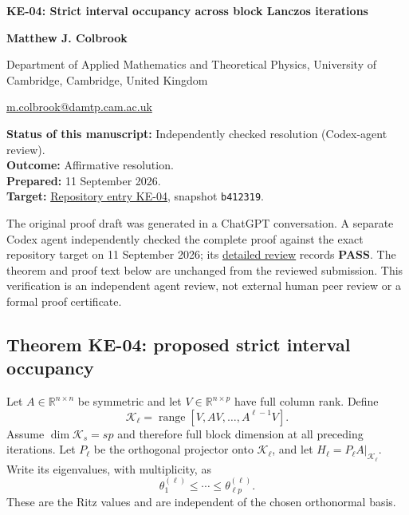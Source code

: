 \documentclass[10pt,a4paper]{article}
\begin{document}
{\raggedright\Large\bfseries KE-04: Strict interval occupancy across
block Lanczos iterations\par}
\vspace{0.4em}
{\normalsize\bfseries Matthew J. Colbrook\par}
{\small Department of Applied Mathematics and Theoretical Physics,
University of Cambridge, Cambridge, United Kingdom\par}
{\small\href{mailto:m.colbrook@damtp.cam.ac.uk}{m.colbrook@damtp.cam.ac.uk}\par}
\vspace{0.6em}
\textbf{Status of this manuscript:} Independently checked resolution
(Codex-agent review).\\
\textbf{Outcome:} Affirmative resolution.\\
\textbf{Prepared:} 11 September 2026.\\
\textbf{Target:}
\href{https://github.com/ajt60gaibb/OpenProblemsInNLA/blob/b4123194697bdf6f8f82518c1dd7d6c40a30c2e0/eigenvalues-and-inverse-problems/KE-04/README.md}{Repository
entry KE-04}, snapshot \texttt{b412319}.

The original proof draft was generated in a ChatGPT conversation. A
separate Codex agent independently checked the complete proof against
the exact repository target on 11 September 2026; its
\href{https://github.com/ajt60gaibb/OpenProblemsInNLA/blob/main/references/colbrook-2026-09-11/verification/reviews/KE-04-review.md}{detailed
review} records \textbf{PASS}. The theorem and proof text below are
unchanged from the reviewed submission. This verification is an
independent agent review, not external human peer review or a formal
proof certificate.

\subsection{Theorem KE-04: proposed strict interval
occupancy}\label{theorem-ke-04-proposed-strict-interval-occupancy}

Let \(A\in\mathbb R^{n\times n}\) be symmetric and let
\(V\in\mathbb R^{n\times p}\) have full column rank. Define \[
\mathcal K_\ell=\operatorname{range}[V,AV,\ldots,A^{\ell-1}V].
\] Assume \(\dim\mathcal K_s=sp\) and therefore full block dimension at
all preceding iterations. Let \(P_\ell\) be the orthogonal projector
onto \(\mathcal K_\ell\), and let
\(H_\ell=P_\ell A|_{\mathcal K_\ell}\). Write its eigenvalues, with
multiplicity, as \[
\theta_1^{(\ell)}\le\cdots\le\theta_{\ell p}^{(\ell)}.
\] These are the Ritz values and are independent of the chosen
orthonormal basis.
\end{document}
